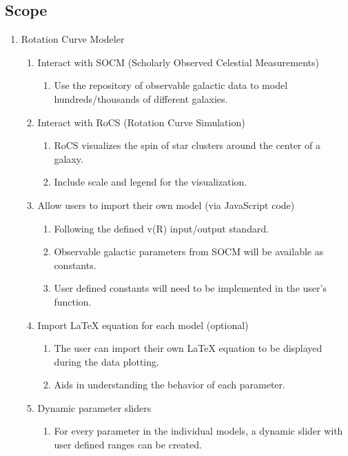 \documentclass[titlepage]{article}
\begin{document}
\subsection{Scope}
\begin{enumerate}
	\item Rotation Curve Modeler
	
  \begin{enumerate}	 	
    \item Interact with SOCM (Scholarly Observed Celestial Measurements)
	\begin{enumerate}
		\item Use the repository of observable galactic data to model hundreds/thousands of different galaxies.
	\end{enumerate}
    \item Interact with RoCS (Rotation Curve Simulation)
	\begin{enumerate}
		\item RoCS visualizes the spin of star clusters around the center of a galaxy. 
		\item Include scale and legend for the visualization.
	\end{enumerate}
    \item Allow users to import their own model (via JavaScript code)
	\begin{enumerate}
		\item Following the defined v(R) input/output standard.
		\item Observable galactic parameters from SOCM will be available as constants.
		\item User defined constants will need to be implemented in the user's function.
	\end{enumerate}
    \item Import LaTeX equation for each model (optional)
	\begin{enumerate}
		\item The user can import their own LaTeX equation to be displayed during the data plotting.
		\item Aids in understanding the behavior of each parameter.
	\end{enumerate}
	\item Dynamic parameter sliders
	\begin{enumerate}
		\item For every parameter in the individual models, a dynamic slider with user defined ranges can be created.
	\end{enumerate}
  \end{enumerate} 

\end{enumerate}
\end{document}
